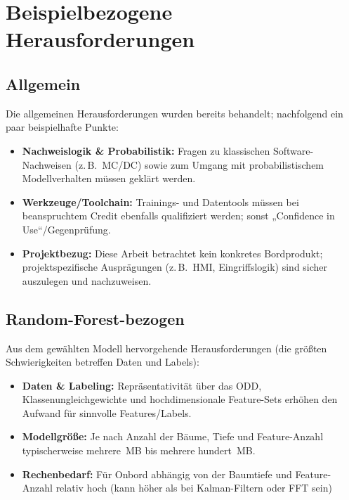 \section{Beispielbezogene Herausforderungen}

\subsection{Allgemein}
Die allgemeinen Herausforderungen wurden bereits behandelt; nachfolgend ein paar beispielhafte Punkte:
\begin{itemize}
  \item \textbf{Nachweislogik \& Probabilistik:} Fragen zu klassischen Software-Nachweisen (z.\,B.\ MC/DC) sowie zum Umgang mit probabilistischem Modellverhalten müssen geklärt werden.
  \item \textbf{Werkzeuge/Toolchain:} Trainings- und Datentools müssen bei beanspruchtem Credit ebenfalls qualifiziert werden; sonst „Confidence in Use“/Gegenprüfung.
  \item \textbf{Projektbezug:} Diese Arbeit betrachtet kein konkretes Bordprodukt; projektspezifische Ausprägungen (z.\,B.\ HMI, Eingriffslogik) sind sicher auszulegen und nachzuweisen.
\end{itemize}

\subsection{Random-Forest-bezogen}
Aus dem gewählten Modell hervorgehende Herausforderungen (die größten Schwierigkeiten betreffen Daten und Labels):
\begin{itemize}
  \item \textbf{Daten \& Labeling:} Repräsentativität über das ODD, Klassenungleichgewichte und hochdimensionale Feature-Sets erhöhen den Aufwand für sinnvolle Features/Labels.
  \item \textbf{Modellgröße:} Je nach Anzahl der Bäume, Tiefe und Feature-Anzahl typischerweise mehrere~MB bis mehrere hundert~MB.
  \item \textbf{Rechenbedarf:} Für Onbord abhängig von der Baumtiefe und Feature-Anzahl relativ hoch (kann höher als bei Kalman-Filtern oder FFT sein)
\end{itemize}

